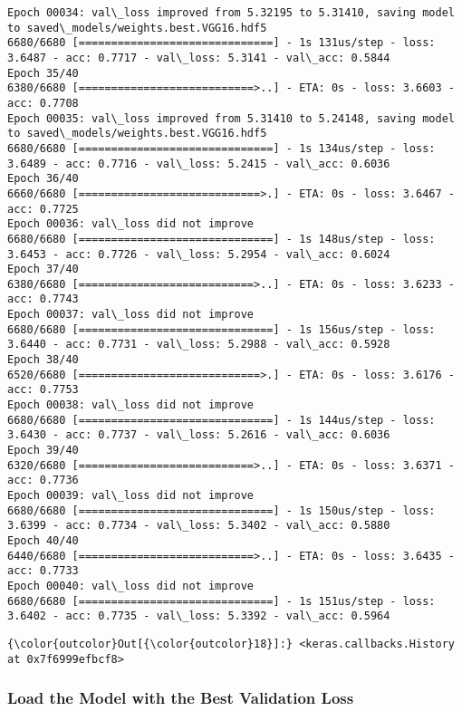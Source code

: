 \documentclass[11pt]{article}
\begin{document}
\begin{Verbatim}[commandchars=\\\{\}]
Epoch 00034: val\_loss improved from 5.32195 to 5.31410, saving model to saved\_models/weights.best.VGG16.hdf5
6680/6680 [==============================] - 1s 131us/step - loss: 3.6487 - acc: 0.7717 - val\_loss: 5.3141 - val\_acc: 0.5844
Epoch 35/40
6380/6680 [===========================>..] - ETA: 0s - loss: 3.6603 - acc: 0.7708
Epoch 00035: val\_loss improved from 5.31410 to 5.24148, saving model to saved\_models/weights.best.VGG16.hdf5
6680/6680 [==============================] - 1s 134us/step - loss: 3.6489 - acc: 0.7716 - val\_loss: 5.2415 - val\_acc: 0.6036
Epoch 36/40
6660/6680 [============================>.] - ETA: 0s - loss: 3.6467 - acc: 0.7725
Epoch 00036: val\_loss did not improve
6680/6680 [==============================] - 1s 148us/step - loss: 3.6453 - acc: 0.7726 - val\_loss: 5.2954 - val\_acc: 0.6024
Epoch 37/40
6380/6680 [===========================>..] - ETA: 0s - loss: 3.6233 - acc: 0.7743
Epoch 00037: val\_loss did not improve
6680/6680 [==============================] - 1s 156us/step - loss: 3.6440 - acc: 0.7731 - val\_loss: 5.2988 - val\_acc: 0.5928
Epoch 38/40
6520/6680 [============================>.] - ETA: 0s - loss: 3.6176 - acc: 0.7753
Epoch 00038: val\_loss did not improve
6680/6680 [==============================] - 1s 144us/step - loss: 3.6430 - acc: 0.7737 - val\_loss: 5.2616 - val\_acc: 0.6036
Epoch 39/40
6320/6680 [===========================>..] - ETA: 0s - loss: 3.6371 - acc: 0.7736
Epoch 00039: val\_loss did not improve
6680/6680 [==============================] - 1s 150us/step - loss: 3.6399 - acc: 0.7734 - val\_loss: 5.3402 - val\_acc: 0.5880
Epoch 40/40
6440/6680 [===========================>..] - ETA: 0s - loss: 3.6435 - acc: 0.7733
Epoch 00040: val\_loss did not improve
6680/6680 [==============================] - 1s 151us/step - loss: 3.6402 - acc: 0.7735 - val\_loss: 5.3392 - val\_acc: 0.5964

    \end{Verbatim}

\begin{Verbatim}[commandchars=\\\{\}]
{\color{outcolor}Out[{\color{outcolor}18}]:} <keras.callbacks.History at 0x7f6999efbcf8>
\end{Verbatim}
            
    \subsubsection{Load the Model with the Best Validation
Loss}\label{load-the-model-with-the-best-validation-loss}
\end{document}
